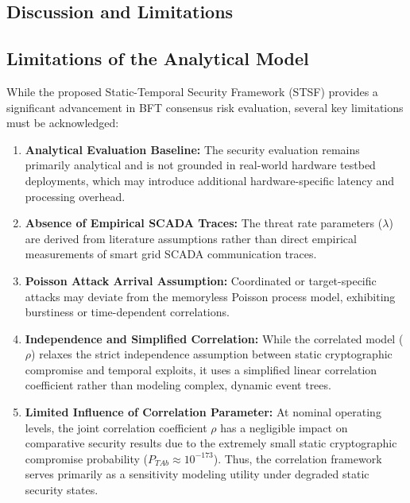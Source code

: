 \documentclass[10pt,twocolumn,letterpaper]{article}
\begin{document}
\begin{enumerate}[leftmargin=*]
\section{Discussion and Limitations}
\label{sec:discussion}

\subsection{Limitations of the Analytical Model}
While the proposed Static-Temporal Security Framework (STSF) provides a significant advancement in BFT consensus risk evaluation, several key limitations must be acknowledged:
\begin{enumerate}[leftmargin=*]
    \item \textbf{Analytical Evaluation Baseline:} The security evaluation remains primarily analytical and is not grounded in real-world hardware testbed deployments, which may introduce additional hardware-specific latency and processing overhead.
    \item \textbf{Absence of Empirical SCADA Traces:} The threat rate parameters ($\lambda$) are derived from literature assumptions rather than direct empirical measurements of smart grid SCADA communication traces.
    \item \textbf{Poisson Attack Arrival Assumption:} Coordinated or target-specific attacks may deviate from the memoryless Poisson process model, exhibiting burstiness or time-dependent correlations.
    \item \textbf{Independence and Simplified Correlation:} While the correlated model ($\rho$) relaxes the strict independence assumption between static cryptographic compromise and temporal exploits, it uses a simplified linear correlation coefficient rather than modeling complex, dynamic event trees.
    \item \textbf{Limited Influence of Correlation Parameter:} At nominal operating levels, the joint correlation coefficient $\rho$ has a negligible impact on comparative security results due to the extremely small static cryptographic compromise probability ($P_{TAb} \approx 10^{-173}$). Thus, the correlation framework serves primarily as a sensitivity modeling utility under degraded static security states.
\end{enumerate}


\end{enumerate}
\end{document}
